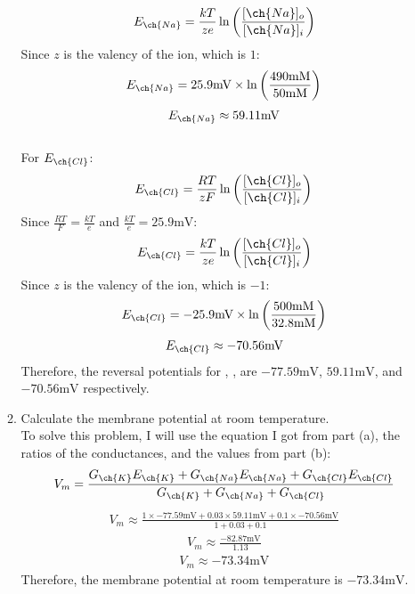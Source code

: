 \documentclass[11pt]{article}
\begin{document}
\begin{enumerate}[label=\arabic*.]
\begin{enumerate}[label=\alph*.]
\begin{align*}
E_{\ch{Na}} = \frac{kT} {ze} \ln{\left(\frac{[\ch{Na}]_o} {[\ch{Na}]_i}\right)}
\end{align*}
Since $z$ is the valency of the  ion, which is $1$:
\begin{align*}
E_{\ch{Na}} = 25.9 \text{mV} \times \ln{\left(\frac{490 \text{mM}} {50 \text{mM}}\right)}
\end{align*}
\begin{align*}
E_{\ch{Na}} \approx 59.11 \text{mV}
\end{align*}
\vspace*{1\baselineskip}
\\
For $E_{\ch{Cl}}$:
\begin{align*}
E_{\ch{Cl}} = \frac{RT} {zF} \ln{\left(\frac{[\ch{Cl}]_o} {[\ch{Cl}]_i}\right)}
\end{align*}
Since $\frac{RT} {F} = \frac{kT} {e}$ and $\frac{kT} {e} = 25.9 \text{mV}$:
\begin{align*}
E_{\ch{Cl}} = \frac{kT} {ze} \ln{\left(\frac{[\ch{Cl}]_o} {[\ch{Cl}]_i}\right)}
\end{align*}
Since $z$ is the valency of the  ion, which is $-1$:
\begin{align*}
E_{\ch{Cl}} = -25.9 \text{mV} \times \ln{\left(\frac{500 \text{mM}} {32.8 \text{mM}}\right)}
\end{align*}
\begin{align*}
E_{\ch{Cl}} \approx -70.56 \text{mV}
\end{align*}
Therefore, the reversal potentials for , ,  are $-77.59 \text{mV}$, $59.11 \text{mV}$, and $-70.56 \text{mV}$ respectively.



\vspace*{1\baselineskip}
\item
Calculate the membrane potential at room temperature.
\vspace*{1\baselineskip}
\\
To solve this problem, I will use the equation I got from part (a), the ratios of the conductances, and the values from part (b):
\begin{align*}
V_m = \frac{G_{\ch{K}} E_{\ch{K}} + G_{\ch{Na}} E_{\ch{Na}} + G_{\ch{Cl}} E_{\ch{Cl}}} {G_{\ch{K}} + G_{\ch{Na}} + G_{\ch{Cl}}}
\end{align*}
\begin{align*}
V_m \approx \frac{1 \times -77.59 \text{mV} + 0.03 \times 59.11 \text{mV} + 0.1 \times -70.56 \text{mV}} {1 + 0.03 + 0.1}
\end{align*}
\begin{align*}
V_m \approx \frac{-82.87 \text{mV}} {1.13}
\end{align*}
\begin{align*}
V_m \approx -73.34 \text{mV}
\end{align*}
Therefore, the membrane potential at room temperature is $-73.34 \text{mV}$.




\end{enumerate}
\end{enumerate}
\end{document}
